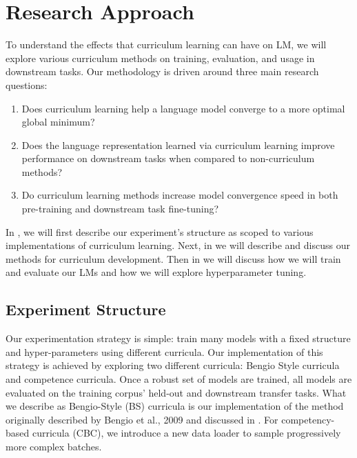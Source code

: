 \chapter{Research Approach}
\label{chap:method}
To understand the effects that curriculum learning can have on LM, we will explore various curriculum methods on training, evaluation, and usage in downstream tasks. 
Our methodology is driven around three main research questions:
\begin{enumerate}
\item Does curriculum learning help a language model converge to a more optimal global minimum? 
\item Does the language representation learned via curriculum learning improve performance on downstream tasks when compared to non-curriculum methods?
\item  Do curriculum learning methods increase model convergence speed in both pre-training and downstream task fine-tuning?
\end{enumerate}
In , we will first describe our experiment's structure as scoped to various implementations of curriculum learning. Next, in  we will describe and discuss our methods for curriculum development. Then in  we will discuss how we will train and evaluate our LMs and how we will explore hyperparameter tuning.
\section{Experiment Structure}
\label{chap:method:sec:structure}
Our experimentation strategy is simple: train many models with a fixed structure and hyper-parameters using different curricula. Our implementation of this strategy is achieved by exploring two different curricula: Bengio Style curricula and competence curricula. Once a robust set of models are trained, all models are evaluated on the training corpus' held-out and downstream transfer tasks. What we describe as Bengio-Style (BS) curricula is our implementation of the method originally described by Bengio et al., 2009 \cite{Bengio2009CurriculumL} and discussed in . For competency-based curricula (CBC), we introduce a new data loader to sample progressively more complex batches. 
